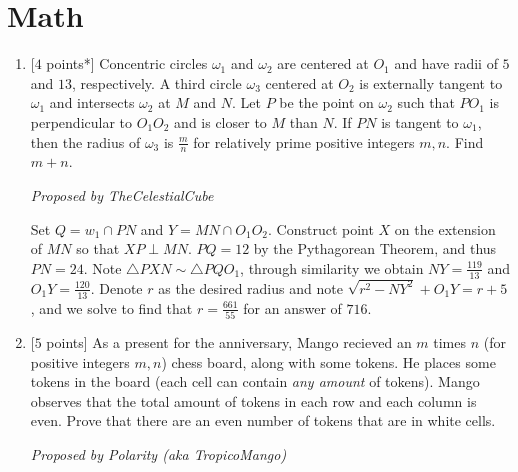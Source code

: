 \section*{\textsf{\textbf{\textcolor{meablue}{Math}}}}
\begin{enumerate}[align=left,start=1,label=\textbf{\textcolor{meablue}{Problem \arabic*}}]
    \item {[$4$ points*]} Concentric circles $\omega_1$ and $\omega_2$ are centered at $O_1$ and have radii of $5$ and $13$, respectively. A third circle $\omega_3$ centered at $O_2$ is externally tangent to $\omega_1$ and intersects $\omega_2$ at $M$ and $N$. Let $P$ be the point on $\omega_2$ such that $PO_1$ is perpendicular to $O_1 O_2$ and is closer to $M$ than $N$. If $PN$ is tangent to $\omega_1$, then the radius of $\omega_3$ is $\frac{m}{n}$ for relatively prime positive integers $m, n$. Find $m + n$.
    
    \textrm{\emph{Proposed by TheCelestialCube}}

    \begin{solution}
        Set $Q = w_1 \cap PN$ and $Y = MN \cap O_1 O_2$. Construct point $X$ on the extension of $MN$ so that $XP \perp MN$. $PQ = 12$ by the Pythagorean Theorem, and thus $PN = 24$. Note $\triangle PXN \sim \triangle P Q O_1$, through similarity we obtain $NY = \frac{119}{13}$ and $O_1 Y = \frac{120}{13}$. Denote $r$ as the desired radius and note $\sqrt{r^2 - NY^2} + O_1 Y = r + 5$, and we solve to find that $r = \frac{661}{55}$ for an answer of $716$.
    \end{solution}
    \item {[$5$ points]}
        As a present for the anniversary, Mango recieved an $m$ times $n$ (for positive integers $m, n$) chess board, along with some tokens. He places some tokens in the board (each cell can contain \emph{any amount} of tokens). Mango observes that the total amount of tokens in each row and each column is even. Prove that there are an even number of tokens that are in white cells.

    \textrm{\emph{Proposed by Polarity (aka TropicoMango)}}
    

\end{enumerate}
